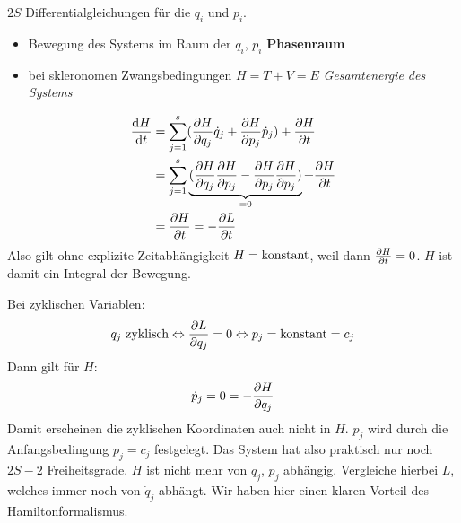 \begin{bemerkung*}
	$2S$ Differentialgleichungen für die $q_i$ und $p_i$.
	\begin{itemize}
		\item Bewegung des Systems im Raum der $q_i$, $p_i$ \conseq \textbf{Phasenraum}
		\item bei skleronomen Zwangsbedingungen $H = T + V = E$ \textit{Gesamtenergie des Systems}
	\end{itemize}
\end{bemerkung*}
\begin{align*}
	\frac{\mathrm d H}{\mathrm d t} &= \sum_{j=1}^{s} (\frac{\partial H}{\partial q_j} \dot{q}_j + \frac{\partial H}{\partial p_j} \dot{p}_j) + \frac{\partial H}{\partial t}\\
	&= \sum_{j=1}^{s} \underbrace{(\frac{\partial H}{\partial q_j} \frac{\partial H}{\partial p_j} - \frac{\partial H}{\partial p_j} \frac{\partial H}{\partial p_j})}_{=0}+ \frac{\partial H}{\partial t}\\
	&= \frac{\partial H}{\partial t} = - \frac{\partial L}{\partial t}
\end{align*} 
Also gilt ohne explizite Zeitabhängigkeit $H = \text{konstant}$, weil dann $\frac{\partial H}{\partial t} = 0$. $H$ ist damit ein Integral der Bewegung.

Bei zyklischen Variablen:
$$q_j \text{~zyklisch} \Leftrightarrow \frac{\partial L}{\partial q_j} = 0 \Leftrightarrow p_j = \text{konstant} = c_j$$
Dann gilt für $H$:
$$\dot{p}_j = 0 = -\frac{\partial H}{\partial q_j}$$
Damit erscheinen die zyklischen Koordinaten auch nicht in $H$.
$p_j$ wird durch die Anfangsbedingung $p_j = c_j$ festgelegt. Das System hat also praktisch nur noch $2S - 2$ Freiheitsgrade.
$H$ ist nicht mehr von $q_j$, $p_j$ abhängig. Vergleiche hierbei $L$, welches immer noch von $\dot{q}_j$ abhängt. Wir haben hier einen klaren Vorteil des Hamiltonformalismus.

